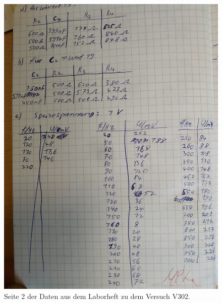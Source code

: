 \begin{figure}
    \centering
    \includegraphics[width=\textwidth, angle=270]{content/daten2.jpg}
    \caption{Seite 2 der Daten aus dem Laborheft zu dem Versuch V302.}
\end{figure}